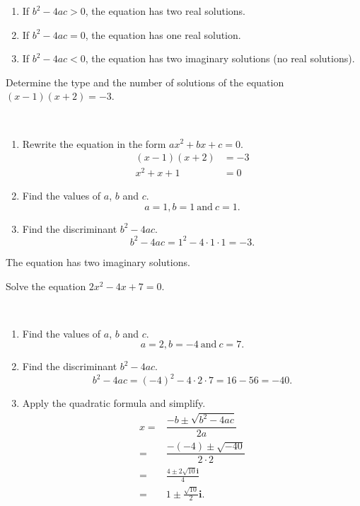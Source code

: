 \documentclass[en,12pt]{elegantbook}
\providecommand{\tightlist}{%
  \setlength{\itemsep}{0pt}\setlength{\parskip}{0pt}}
\newcommand{\ii}{\mathbf{i}}
\let\BeginKnitrBlock\begin \let\EndKnitrBlock\end
\begin{document}
\begin{enumerate}
\def\labelenumi{\arabic{enumi}.}
\tightlist
\item
  If \(b^2-4ac>0\), the equation has two real solutions.
\item
  If \(b^2-4ac=0\), the equation has one real solution.
\item
  If \(b^2-4ac<0\), the equation has two imaginary solutions (no real solutions).
\end{enumerate}

\BeginKnitrBlock{example}
\protect\hypertarget{exm:unnamed-chunk-151}{}{\label{exm:unnamed-chunk-151} }
Determine the type and the number of solutions of the equation \((x-1)(x+2)=-3\).
\EndKnitrBlock{example}

\BeginKnitrBlock{solution}
{}\\

\begin{enumerate}
\def\labelenumi{\arabic{enumi}.}
\item
  Rewrite the equation in the form \(ax^2+bx+c=0\).
  \[
       \begin{aligned}
           (x-1)(x+2)&=-3\\
           x^2+x+1&=0
       \end{aligned}
   \]
\item
  Find the values of \(a\), \(b\) and \(c\).
  \[
       a=1, b=1 ~\text{and}~ c=1.
   \]
\item
  Find the discriminant \(b^2-4ac\).
  \[
       b^2-4ac=1^2-4\cdot 1\cdot 1=-3.
   \]
\end{enumerate}

The equation has two imaginary solutions.
\EndKnitrBlock{solution}

\BeginKnitrBlock{example}
\protect\hypertarget{exm:unnamed-chunk-153}{}{\label{exm:unnamed-chunk-153} }
Solve the equation \(2x^2-4x+7=0\).
\EndKnitrBlock{example}

\BeginKnitrBlock{solution}
{}\\

\begin{enumerate}
\def\labelenumi{\arabic{enumi}.}
\item
  Find the values of \(a\), \(b\) and \(c\).
  \[
       a=2, b=-4 ~\text{and}~ c=7.
   \]
\item
  Find the discriminant \(b^2-4ac\).
  \[
       b^2-4ac=(-4)^2-4\cdot 2\cdot 7=16-56=-40.
   \]
\item
  Apply the quadratic formula and simplify.
  \[
   \begin{aligned}
       x=&\dfrac{-b\pm\sqrt{b^2-4ac}}{2a}\\
       =&\dfrac{-(-4)\pm\sqrt{-40}}{2\cdot 2}\\
       =&\frac{4\pm 2\sqrt{10} \ii}{4}\\
       =&1\pm\frac{\sqrt{10}}{2}\ii.
   \end{aligned}
   \]
\end{enumerate}
\EndKnitrBlock{solution}
\end{document}
